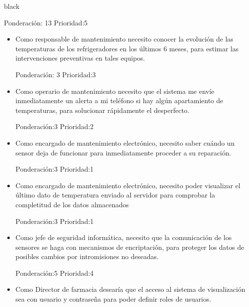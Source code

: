 \documentclass[11pt]{charter}
\begin{document}
\begin{consigna}{black}
\begin{itemize}
\begin{itemize}
Ponderación: 13 Prioridad:5
	\end{itemize}

\end{itemize}

\begin{itemize}
\item Como responsable de mantenimiento necesito conocer la evolución de las temperaturas de los refrigeradores en los últimos 6 meses, para estimar las intervenciones preventivas en tales equipos. 

Ponderación: 3 Prioridad:3
\end{itemize}


\begin{itemize}
\item Como operario de mantenimiento necesito que el sistema me envíe inmediatamente un alerta a mi teléfono si hay algún apartamiento de temperaturas, para solucionar rápidamente el desperfecto. 

Ponderación:3 Prioridad:2
\end{itemize}


\begin{itemize}
\item Como encargado de mantenimiento electrónico, necesito saber cuándo un sensor deja de funcionar para inmediatamente proceder a su reparación. 

Ponderación:3 Prioridad:1
\end{itemize}

\begin{itemize}
\item Como encargado de mantenimiento electrónico, necesito poder visualizar el último dato de temperatura enviado al servidor para comprobar la completitud de los datos almacenados

Ponderación:3 Prioridad:1
\end{itemize}


\begin{itemize}
\item Como jefe de seguridad informática, necesito que la comunicación de los sensores se haga con mecanismos de encriptación, para proteger los datos de posibles cambios por intromisiones no deseadas. 

Ponderación:5 Prioridad:4
\end{itemize}


\begin{itemize}
\item Como Director de farmacia desearía que el acceso al sistema de visualización sea con usuario y contraseña para poder definir roles de usuarios. 


\end{itemize}
\end{consigna}
\end{document}
